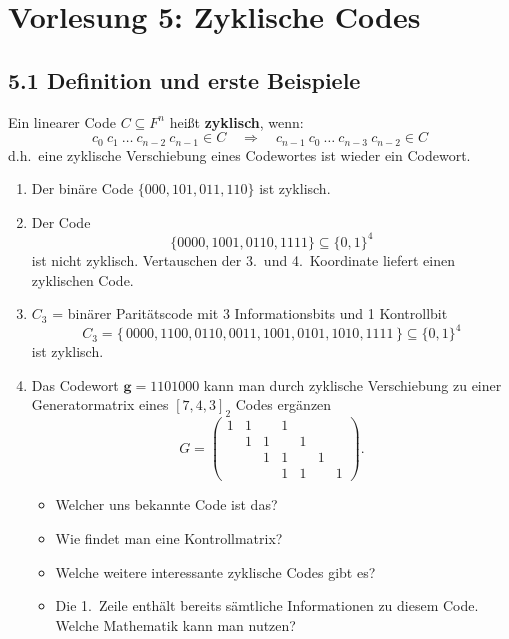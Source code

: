 
\section{Vorlesung 5: Zyklische Codes}
\subsection{5.1 Definition und erste Beispiele}

\begin{definition}
Ein linearer Code $C \subseteq F^n$ heißt \textbf{zyklisch}, wenn:
\[
c_0\ c_1\ \dots\ c_{n-2}\ c_{n-1} \in C
\quad\Rightarrow\quad
c_{n-1}\ c_0\ \dots\ c_{n-3}\ c_{n-2} \in C
\]
d.h.\ eine zyklische Verschiebung eines Codewortes ist wieder ein Codewort.
\end{definition}

\begin{beispiel}[Beispiele]\leavevmode
\begin{enumerate}[label=\alph*)]
\item Der binäre Code $\{000, 101, 011, 110\}$ ist zyklisch.
\item Der Code
\[
\{0000, 1001, 0110, 1111\} \subseteq \{0,1\}^4
\]
ist nicht zyklisch. Vertauschen der 3.\ und 4.\ Koordinate liefert einen zyklischen Code.
\item $C_3$ = binärer Paritätscode mit 3 Informationsbits und 1 Kontrollbit
\[
C_3 = \{\, 0000, 1100, 0110, 0011, 1001, 0101, 1010, 1111 \,\} \subseteq \{0,1\}^4
\]
ist zyklisch.
\item Das Codewort $\mathbf{g} = 1101000$ kann man durch zyklische Verschiebung zu einer Generatormatrix eines $[7,4,3]_2$ Codes ergänzen
\[
G = \begin{pmatrix}
1 & 1 &   & 1 &   &   &   \\
  & 1 & 1 &   & 1 &   &   \\
  &   & 1 & 1 &   & 1 &   \\
  &   &   & 1 & 1 &   & 1
\end{pmatrix}.
\]
\begin{itemize}
\item[-] Welcher uns bekannte Code ist das?
\item[-] Wie findet man eine Kontrollmatrix?
\item[-] Welche weitere interessante zyklische Codes gibt es?
\item[-] Die 1.\ Zeile enthält bereits sämtliche Informationen zu diesem Code. Welche Mathematik kann man nutzen?
\end{itemize}
\end{enumerate}
\end{beispiel}

